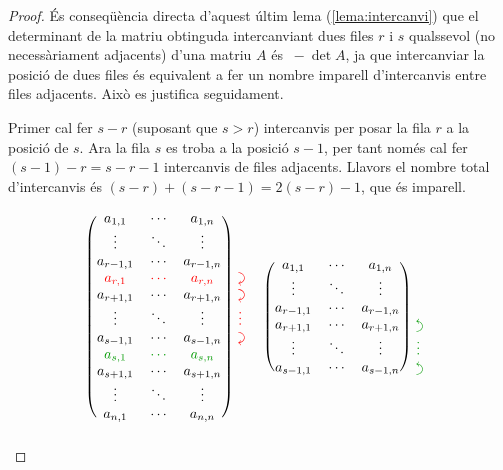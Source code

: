 \begin{teo}
\begin{proof}
\vspace{5mm}

És conseqüència directa d'aquest últim lema (\ref{lema:intercanvi}) que el determinant de la matriu obtinguda intercanviant dues files $r$ i $s$ qualssevol (no necessàriament adjacents) d'una matriu $A$ és $\ -\det A$, ja que intercanviar la posició de dues files és equivalent a fer un nombre imparell d'intercanvis entre files adjacents. Això es justifica seguidament.

Primer cal fer $s-r$ (suposant que $s>r$) intercanvis per posar la fila $r$ a la posició de $s$. Ara la fila $s$ es troba a la posició $s-1$, per tant només cal fer $(s-1)-r = s-r-1$ intercanvis de files adjacents. Llavors el nombre total d'intercanvis és $(s-r)+(s-r-1) = 2(s-r) - 1$, que és imparell.

\[
	\begin{blockarray}{cccc}
	\begin{block}{(ccc)*{1}{>{\color{red}}l<{}}}
	a_{1,1}&	\cdots&		a_{1,n}& 		\\
	\vdots&		\ddots&		\vdots& 		\\
	a_{r-1,1}&	\cdots&		a_{r-1,n}&    	\\
	\rd a_{r,1}&\rd\cdots&	\rd a_{r,n}&    \dcarr \\
	a_{r+1,1}&	\cdots&		a_{r+1,n}&    	\dcarr\\
	\vdots&		\ddots&		\vdots& 		\vdots\\
	a_{s-1,1}&	\cdots&		a_{s-1,n}&    	\dcarr \\
	\gre a_{s,1}&\gre\cdots&	\gre a_{s,n}&    \\
	a_{s+1,1}&	\cdots&		a_{s+1,n}&    	\\
	\vdots&		\ddots&		\vdots& 		\\
	a_{n,1}&	\cdots&		a_{n,n}& 		\\	
	\end{block}
	\end{blockarray}
	\quad
	\begin{blockarray}{cccc}
	\begin{block}{(ccc)*{1}{>{\color{ForestGreen}}l<{}}}
	a_{1,1}&	\cdots&		a_{1,n}& 		\\
	\vdots&		\ddots&		\vdots& 		\\
	a_{r-1,1}&	\cdots&		a_{r-1,n}&    	\\
	a_{r+1,1}&	\cdots&		a_{r+1,n}&    	\ucarr\\
	\vdots&		\ddots&		\vdots& 		\vdots\\
	a_{s-1,1}&	\cdots&		a_{s-1,n}&    	\ucarr\\

\end{block}
\end{blockarray}\]
\end{proof}
\end{teo}
